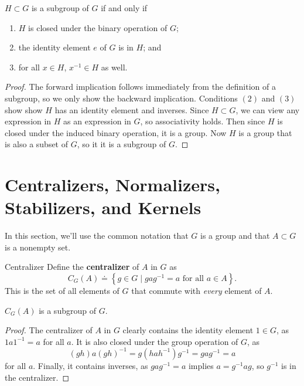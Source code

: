 \documentclass[10pt]{report}
\begin{document}
\begin{prop}
	\label{prop:subgroup}
	$H \subset G$ is a subgroup of $G$ if and only if
	\begin{enumerate}
		\item $H$ is closed under the binary operation of $G$;
		\item the identity element $e$ of $G$ is in $H$; and
		\item for all $x \in H$, $x^{-1} \in H$ as well.
	\end{enumerate}
\end{prop}
\begin{proof}
	The forward implication follows immediately from the definition of a subgroup, so we only show the backward implication. Conditions $(2)$ and $(3)$ show show $H$ has an identity element and inverses. Since $H \subset G$, we can view any expression in $H$ as an expression in $G$, so associativity holds. Then since $H$ is closed under the induced binary operation, it is a group. Now $H$ is a group that is also a subset of $G$, so it it is a subgroup of $G$.
\end{proof}



\section{Centralizers, Normalizers, Stabilizers, and Kernels}

In this section, we'll use the common notation that $G$ is a group and that $A \subset G$ is a nonempty set.

\begin{defn}{Centralizer}{}
Define the \textbf{centralizer} of $A$ in $G$ as
\[
	C_G(A) \doteq \left\{ g\in G\;|\; ga g^{-1}=a \text{ for all } a \in A \right\}.
\] This is the set of all elements of $G$ that commute with \textit{every} element of $A$.
\end{defn}

\begin{prop}
	$C_G(A)$ is a subgroup of $G$.
\end{prop}
\begin{proof}
	The centralizer of $A$ in $G$ clearly contains the identity element $1 \in G$, as $1 a 1^{-1} = a$ for all $a$. It is also closed under the group operation of $G$, as
	\[
		(gh) a (gh)^{-1} = g(hah^{-1})g^{-1} = gag^{-1} = a
	\] for all $a$. Finally, it contains inverses, as $gag^{-1}=a$ implies $a = g^{-1}ag$, so $g^{-1}$ is in the centralizer.
\end{proof}
\end{document}
